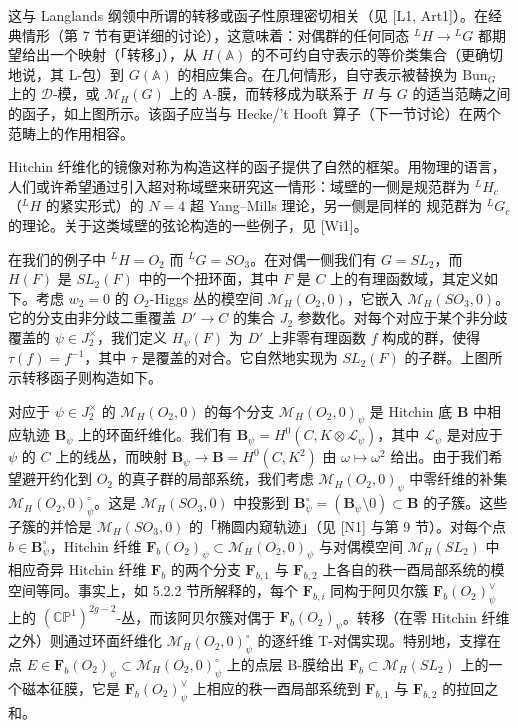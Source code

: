 \documentclass[11pt,a4paper]{article}
\newcommand{\Bun}{\mathrm{Bun}}
\newcommand{\CD}{\mathcal{D}}
\begin{document}
这与 Langlands 纲领中所谓的转移或函子性原理密切相关（见 [L1, Art1]）。在经典情形（第 7 节有更详细的讨论），这意味着：对偶群的任何同态 ${}^{L}H\to{}^{L}G$ 都期望给出一个映射（「转移」），从 $H(\mathbb{A})$ 的不可约自守表示的等价类集合（更确切地说，其 L-包）到 $G(\mathbb{A})$ 的相应集合。在几何情形，自守表示被替换为 $\Bun_G$ 上的 $\CD$-模，或 $\mathcal{M}_H(G)$ 上的 A-膜，而转移成为联系于 $H$ 与 $G$ 的适当范畴之间的函子，如上图所示。该函子应当与 Hecke/'t Hooft 算子（下一节讨论）在两个范畴上的作用相容。

Hitchin 纤维化的镜像对称为构造这样的函子提供了自然的框架。用物理的语言，人们或许希望通过引入超对称域壁来研究这一情形：域壁的一侧是规范群为 ${}^{L}H_c$（${}^{L}H$ 的紧实形式）的 $N=4$ 超 Yang--Mills 理论，另一侧是同样的
规范群为 ${}^{L}G_c$ 的理论。关于这类域壁的弦论构造的一些例子，见 [Wi1]。

在我们的例子中 ${}^{L}H = O_2$ 而 ${}^{L}G = SO_3$。在对偶一侧我们有 $G = SL_2$，而 $H(F)$ 是 $SL_2(F)$ 中的一个扭环面，其中 $F$ 是 $C$ 上的有理函数域，其定义如下。考虑 $w_2=0$ 的 $O_2$-Higgs 丛的模空间 $\mathcal{M}_H(O_2,0)$，它嵌入 $\mathcal{M}_H(SO_3,0)$。它的分支由非分歧二重覆盖 $D'\to C$ 的集合 $J_2$ 参数化。对每个对应于某个非分歧覆盖的 $\psi\in J_2^\times$，我们定义 $H_\psi(F)$ 为 $D'$ 上非零有理函数 $f$ 构成的群，使得 $\tau(f) = f^{-1}$，其中 $\tau$ 是覆盖的对合。它自然地实现为 $SL_2(F)$ 的子群。上图所示转移函子则构造如下。

对应于 $\psi\in J_2^\times$ 的 $\mathcal{M}_H(O_2,0)$ 的每个分支 $\mathcal{M}_H(O_2,0)_\psi$ 是 Hitchin 底 $\boldsymbol{B}$ 中相应轨迹 $\boldsymbol{B}_\psi$ 上的环面纤维化。我们有 $\boldsymbol{B}_\psi = H^0(C,K\otimes\mathcal{L}_\psi)$，其中 $\mathcal{L}_\psi$ 是对应于 $\psi$ 的 $C$ 上的线丛，而映射 $\boldsymbol{B}_\psi\to\boldsymbol{B} = H^0(C,K^2)$ 由 $\omega\mapsto\omega^2$ 给出。由于我们希望避开约化到 $O_2$ 的真子群的局部系统，我们考虑 $\mathcal{M}_H(O_2,0)_\psi$ 中零纤维的补集 $\mathcal{M}_H(O_2,0)_\psi^\circ$。这是 $\mathcal{M}_H(SO_3,0)$ 中投影到 $\boldsymbol{B}_\psi^\circ = (\boldsymbol{B}_\psi\setminus 0)\subset\boldsymbol{B}$ 的子簇。这些子簇的并恰是 $\mathcal{M}_H(SO_3,0)$ 的「椭圆内窥轨迹」（见 [N1] 与第 9 节）。对每个点 $b\in\boldsymbol{B}_\psi^\circ$，Hitchin 纤维 $\boldsymbol{F}_b(O_2)_\psi\subset\mathcal{M}_H(O_2,0)_\psi$ 与对偶模空间 $\mathcal{M}_H(SL_2)$ 中相应奇异 Hitchin 纤维 $\boldsymbol{F}_b$ 的两个分支 $\boldsymbol{F}_{b,1}$ 与 $\boldsymbol{F}_{b,2}$ 上各自的秩一酉局部系统的模空间等同。事实上，如 5.2.2 节所解释的，每个 $\boldsymbol{F}_{b,i}$ 同构于阿贝尔簇 $\boldsymbol{F}_b(O_2)_\psi^\vee$ 上的 $(\mathbb{CP}^1)^{2g-2}$-丛，而该阿贝尔簇对偶于 $\boldsymbol{F}_b(O_2)_\psi$。转移（在零 Hitchin 纤维之外）则通过环面纤维化 $\mathcal{M}_H(O_2,0)_\psi^\circ$ 的逐纤维 T-对偶实现。特别地，支撑在点 $E\in\boldsymbol{F}_b(O_2)_\psi\subset\mathcal{M}_H(O_2,0)_\psi^\circ$ 上的点层 B-膜给出 $\boldsymbol{F}_b\subset\mathcal{M}_H(SL_2)$ 上的一个磁本征膜，它是 $\boldsymbol{F}_b(O_2)_\psi^\vee$ 上相应的秩一酉局部系统到 $\boldsymbol{F}_{b,1}$ 与 $\boldsymbol{F}_{b,2}$ 的拉回之和。
\end{document}

